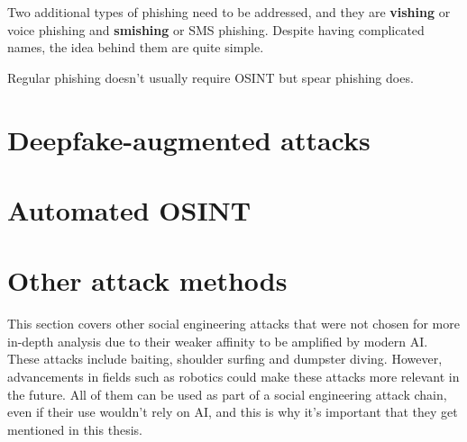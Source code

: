 Two additional types of phishing need to be addressed, and they are \textbf{vishing} or voice phishing and \textbf{smishing} or SMS phishing. Despite having complicated names, the idea behind them are quite simple.

Regular phishing doesn't usually require OSINT but spear phishing does.


\section{Deepfake-augmented attacks }
\begin{comment}
    
    -

\end{comment}



\section{Automated OSINT}
\begin{comment}
    
    - 

\end{comment}



\section{Other attack methods}
\begin{comment}
    
    - 

\end{comment}


This section covers other social engineering attacks that were not chosen for more in-depth analysis due to their weaker affinity to be amplified by modern AI. These attacks include baiting, shoulder surfing and dumpster diving. However, advancements in fields such as robotics could make these attacks more relevant in the future. All of them can be used as part of a social engineering attack chain, even if their use wouldn't rely on AI, and this is why it's important that they get mentioned in this thesis.





